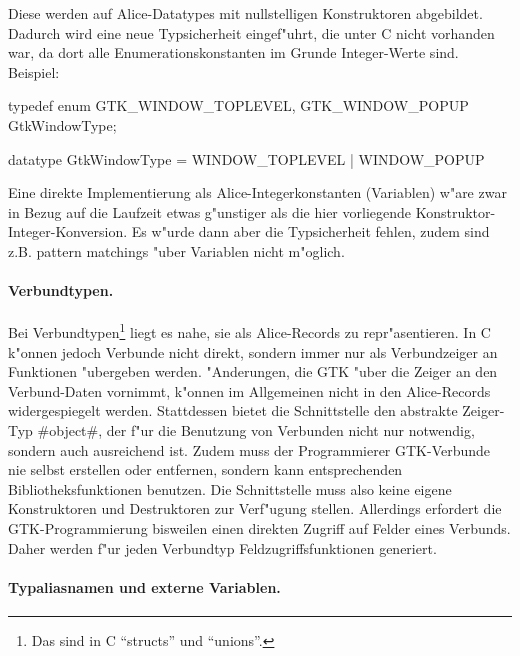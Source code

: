 \documentclass[a4paper,titlepage]{article}
\newcommand{\doparskip}{\bigskip}
\newenvironment{code}{\verbatim}{\endverbatim}
\begin{document}
Diese werden auf Alice-Datatypes mit nullstelligen
Konstruktoren abgebildet. Dadurch wird eine neue Typsicherheit eingef"uhrt,
die unter C nicht vorhanden war, da dort alle Enumerationskonstanten im Grunde
Integer-Werte sind. Beispiel:
\doparskip

\begin{minipage}[t]{5cm}
\begin{code}
typedef enum {
  GTK_WINDOW_TOPLEVEL,
  GTK_WINDOW_POPUP
} GtkWindowType;
\end{code}
\end{minipage}
\begin{minipage}[t]{5cm}
\begin{code}
datatype GtkWindowType =
  WINDOW_TOPLEVEL
| WINDOW_POPUP
\end{code}
\end{minipage}\doparskip

Eine direkte Implementierung als Alice-Integerkonstanten (Variablen)
w"are zwar in Bezug auf die Laufzeit etwas g"unstiger als die hier vorliegende
Konstruktor-Integer-Konversion. Es w"urde dann aber die Typsicherheit fehlen,
zudem sind z.B. pattern matchings "uber Variablen nicht m"oglich.

\paragraph{Verbundtypen.}

Bei Verbundtypen\footnote{Das sind in C ``structs'' und ``unions''.} 
liegt es nahe, sie als Alice-Records zu repr"asentieren. 
In C k"onnen jedoch Verbunde nicht direkt, sondern immer nur als Verbundzeiger
an Funktionen "ubergeben werden. "Anderungen, die GTK "uber die Zeiger
an den Verbund-Daten vornimmt, k"onnen im Allgemeinen nicht in den
Alice-Records widergespiegelt werden.
Stattdessen bietet die Schnittstelle den abstrakte Zeiger-Typ #object#,
der f"ur die Benutzung von Verbunden nicht nur notwendig, sondern auch
ausreichend ist.
Zudem muss der Programmierer GTK-Verbunde nie selbst
erstellen oder entfernen, sondern kann entsprechenden Bibliotheksfunktionen
benutzen.
Die Schnittstelle muss also keine eigene Konstruktoren und Destruktoren
zur Verf"ugung stellen.
Allerdings erfordert die GTK-Programmierung bisweilen einen direkten
Zugriff auf Felder eines Verbunds. Daher werden f"ur jeden
Verbundtyp Feldzugriffsfunktionen generiert.

\paragraph{Typaliasnamen und externe Variablen.}
\end{document}
